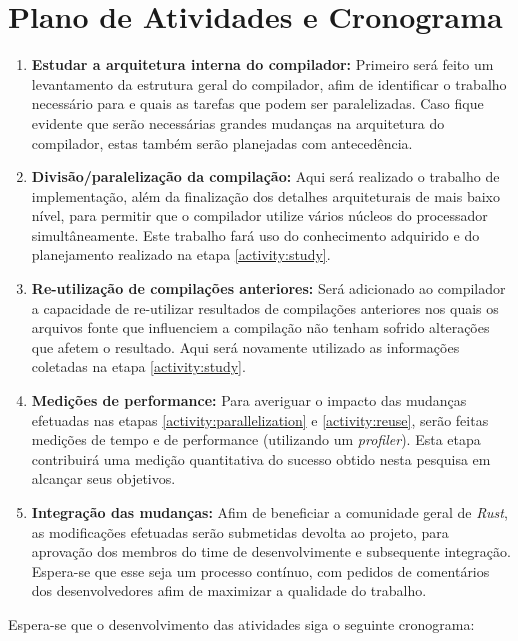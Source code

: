 \documentclass[12pt]{article}
\begin{document}
\section{Plano de Atividades e Cronograma}

\begin{enumerate}
	\item \label{activity:study} \textbf{Estudar a arquitetura interna do compilador:} Primeiro será feito um levantamento da estrutura geral do compilador, afim de identificar o trabalho necessário para e quais as tarefas que podem ser paralelizadas. Caso fique evidente que serão necessárias grandes mudanças na arquitetura do compilador, estas também serão planejadas com antecedência.
	\item \label{activity:parallelization} \textbf{Divisão/paralelização da compilação:} Aqui será realizado o trabalho de implementação, além da finalização dos detalhes arquiteturais de mais baixo nível, para permitir que o compilador utilize vários núcleos do processador simultâneamente. Este trabalho fará uso do conhecimento adquirido e do planejamento realizado na etapa \ref{activity:study}.
	\item \label{activity:reuse} \textbf{Re-utilização de compilações anteriores:} Será adicionado ao compilador a capacidade de re-utilizar resultados de compilações anteriores nos quais os arquivos fonte que influenciem a compilação não tenham sofrido alterações que afetem o resultado. Aqui será novamente utilizado as informações coletadas na etapa \ref{activity:study}.
	\item \label{activity:benchmark} \textbf{Medições de performance:} Para averiguar o impacto das mudanças efetuadas nas etapas \ref{activity:parallelization} e \ref{activity:reuse}, serão feitas medições de tempo e de performance (utilizando um \emph{profiler}). Esta etapa contribuirá uma medição quantitativa do sucesso obtido nesta pesquisa em alcançar seus objetivos.
	\item \label{activity:merging} \textbf{Integração das mudanças:} Afim de beneficiar a comunidade geral de \emph{Rust}, as modificações efetuadas serão submetidas devolta ao projeto, para aprovação dos membros do time de desenvolvimente e subsequente integração. Espera-se que esse seja um processo contínuo, com pedidos de comentários dos desenvolvedores afim de maximizar a qualidade do trabalho.
\end{enumerate}

Espera-se que o desenvolvimento das atividades siga o seguinte cronograma:
\end{document}
